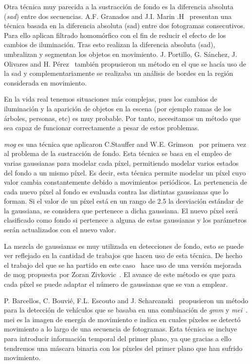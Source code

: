  Otra técnica muy parecida a la sustracción de fondo es la diferencia absoluta (\textit{\acrfull{sad}}) entre dos secuencias. A.F. Granados and J.I. Marin .H~\cite{deteccion_flujo_vehicular} presentan una técnica basada  en la diferencia absoluta (\acrshort{sad}) entre dos fotogramas consecutivos. Para ello aplican filtrado homomórfico con el fin de reducir el efecto de los cambios de iluminación. Tras esto realizan la diferencia absoluta (\acrshort{sad}), umbralizan y segmentan los objetos en movimiento. J. Portillo, G. Sánchez, J. Olivares and H. Pérez~\cite{deteccion_movimiento} también propusieron un método en el que se hacía uso de la \acrshort{sad} y complementariamente se realizaba un análisis de bordes en la región considerada en movimiento.

En la vida real tenemos situaciones más complejas, pues los cambios de iluminación y la aparición de objetos en la escena (por ejemplo ramas de los árboles, personas, etc) es muy probable. Por tanto, necesitamos un método que sea capaz de funcionar correctamente a pesar de estos problemas.

\textit{\acrfull{mog}} es una técnica que aplicaron C.Stauffer and  W.E.  Grimson~\cite{adaptative_background} por primera vez al problema de la sustracción de fondo. Esta técnica se basa en el empleo de varias gaussianas para modelar cada píxel, permitiendo modelar varios estados del fondo a un mismo píxel. Es decir, esta técnica permite modelar un píxel cuyo valor cambia constantemente debido a movimientos periódicos.  La pertenencia de cada nuevo píxel al fondo es evaluada contra las distintas gaussianas que lo forman. Si el valor de un píxel está en un rango de 2.5 la desviación estándar de la gaussiana, se considera que pertenece a dicha gaussiana. El nuevo píxel será clasificado como fondo si pertenece a alguna de estas gaussianas y los parámetros serán actualizados con el nuevo valor.

La mezcla de gaussianas es muy utilizada en detecciones de fondo, esto se puede ver reflejado en la cantidad de trabajos que hacen uso de esta técnica. De hecho el trabajo del que se ha partido en este caso~\cite{redo_tesis} hace uso de una versión mejorada de \acrshort{mog} propuesta por Zoran Zivkovic~\cite{zoran_zivkovic}. El avance de este método es que para cada píxel se puede adaptar el número de gaussianas que se van a emplear.


P. Barcellos, C. Bouvié, F.L. Escouto and  J. Scharcanski~\cite{gmm_mei_article} propusieron un método para la detección de vehículos que se basaba en una combinación de \textit{\acrfull{gmm}} y \textit{\acrfull{mei}}~\cite{mei_article}. \acrshort{mei} es la imagen de energía de movimiento e indica en cuales píxeles se detectó movimiento a lo largo de una secuencia de fotogramas. Esta técnica se incluye para introducir información temporal del primer plano, ya que gracias a ello tendremos una máscara binaria con los píxeles del primer plano que han sufrido movimiento.

